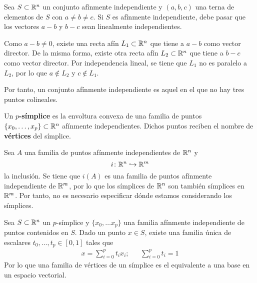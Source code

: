 Sea $S \subset \mathbb{R}^n$ un conjunto afínmente independiente y $(a,b,c)$ una terna de elementos de $S$ con $a\neq b \neq c$.
Si $S$ es afínmente independiente, debe pasar que los vectores $a-b$ y $b-c$ sean linealmente independientes.

Como $a-b\neq 0$, existe una recta afín $L_1 \subset \mathbb{R}^n$ que tiene a $a-b$ como vector director.
De la misma forma, existe otra recta afín $L_2 \subset \mathbb{R}^n$ que tiene a $b-c$ como vector director.
Por independencia lineal, se tiene que $L_1$ no es paralelo a $L_2$, por lo que $a \not\in L_2$ y $c \not\in L_1$.

Por tanto, un conjunto afínmente independiente es aquel en el que no hay tres puntos colineales.

\begin{definition}
	Un \textbf{$p$-símplice} es la envoltura convexa de una familia de puntos $\{x_0, \dots,x_p\} \subset \mathbb{R}^n$ afínmente independientes.
	Dichos puntos reciben el nombre de \textbf{vértices} del símplice.
\end{definition}


Sea $A$ una familia de puntos afínmente independientes de $\mathbb{R}^n$ y
	\[i\colon \mathbb{R}^n \hookrightarrow \mathbb{R}^m\]
la inclusión.
Se tiene que $i(A)$ es una familia de puntos afínmente independiente de $\mathbb{R}^m$, por lo que los símplices de $\mathbb{R}^n$ son también símplices en $\mathbb{R}^m$.
Por tanto, no es necesario especificar dónde estamos considerando los símplices.

\begin{proposition}
	Sea $S\subset \mathbb{R}^n$ un $p$-símplice y $\{x_0,\dots x_p\}$ una familia afínmente independiente de puntos contenidos en $S$.
	Dado un punto $x \in S$, existe una familia única de escalares $t_0,\dots, t_p \in [0,1]$ tales que
	\begin{align*}
		x=\sum^p_{i=0}t_ix_i; && \sum^p_{i=0}t_i=1
	\end{align*}
	Por lo que una familia de vértices de un símplice es el equivalente a una base en un espacio vectorial.
\end{proposition}

